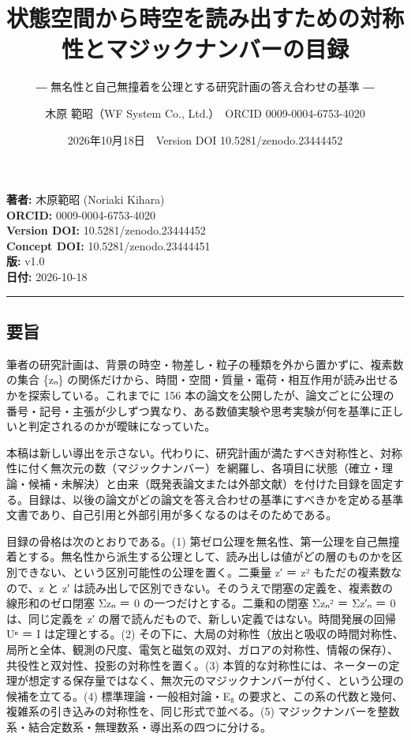 \documentclass[
  a4paper,
]{ltjsarticle}
\title{状態空間から時空を読み出すための対称性とマジックナンバーの目録}
\subtitle{― 無名性と自己無撞着を公理とする研究計画の答え合わせの基準 ―}
\author{木原 範昭（WF System Co., Ltd.）　ORCID 0009-0004-6753-4020}
\date{2026年10月18日　Version DOI 10.5281/zenodo.23444452}
\begin{document}
\maketitle

\textbf{著者:} 木原範昭 (Noriaki Kihara)\\
\textbf{ORCID:} 0009-0004-6753-4020\\
\textbf{Version DOI:} 10.5281/zenodo.23444452\\
\textbf{Concept DOI:} 10.5281/zenodo.23444451\\
\textbf{版:} v1.0\\
\textbf{日付:} 2026-10-18

\begin{center}\rule{0.5\linewidth}{0.5pt}\end{center}

\subsection{要旨}\label{ux8981ux65e8}

筆者の研究計画は、背景の時空・物差し・粒子の種類を外から置かずに、複素数の集合
\{zₙ\}
の関係だけから、時間・空間・質量・電荷・相互作用が読み出せるかを探索している。これまでに
156
本の論文を公開したが、論文ごとに公理の番号・記号・主張が少しずつ異なり、ある数値実験や思考実験が何を基準に正しいと判定されるのかが曖昧になっていた。

本稿は新しい導出を示さない。代わりに、研究計画が満たすべき対称性と、対称性に付く無次元の数（マジックナンバー）を網羅し、各項目に状態（確立・理論・候補・未解決）と由来（既発表論文または外部文献）を付けた目録を固定する。目録は、以後の論文がどの論文を答え合わせの基準にすべきかを定める基準文書であり、自己引用と外部引用が多くなるのはそのためである。

目録の骨格は次のとおりである。(1)
第ゼロ公理を無名性、第一公理を自己無撞着とする。無名性から派生する公理として、読み出しは値がどの層のものかを区別できない、という区別可能性の公理を置く。二乗量
z′ ＝ z² もただの複素数なので、z と z′
は読み出しで区別できない。そのうえで閉塞の定義を、複素数の線形和のゼロ閉塞
Σzₙ ＝ 0 の一つだけとする。二乗和の閉塞 Σzₙ² ＝ Σz′ₙ ＝ 0 は、同じ定義を
z′ の層で読んだもので、新しい定義ではない。時間発展の回帰 Uⁿ ＝ I
は定理とする。(2)
その下に、大局の対称性（放出と吸収の時間対称性、局所と全体、観測の尺度、電気と磁気の双対、ガロアの対称性、情報の保存）、共役性と双対性、投影の対称性を置く。(3)
本質的な対称性には、ネーターの定理が想定する保存量ではなく、無次元のマジックナンバーが付く、という公理の候補を立てる。(4)
標準理論・一般相対論・E₈
の要求と、この系の代数と幾何、複雑系の引き込みの対称性を、同じ形式で並べる。(5)
マジックナンバーを整数系・結合定数系・無理数系・導出系の四つに分ける。
\end{document}
